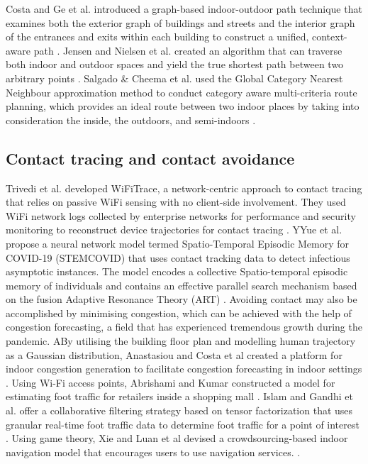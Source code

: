 \documentclass[acmtog]{acmart}
\begin{document}
Costa and Ge et al. introduced a graph-based indoor-outdoor path technique that examines both the exterior graph of buildings and streets and the interior graph of the entrances and exits within each building to construct a unified, context-aware path \cite{costa2019caprio}. Jensen and Nielsen et al. created an algorithm that can traverse both indoor and outdoor spaces and yield the true shortest path between two arbitrary points \cite{jensen2016outdoor}. Salgado \& Cheema et al. used the Global Category Nearest Neighbour approximation method to conduct category aware multi-criteria route planning, which provides an ideal route between two indoor places by taking into consideration the inside, the outdoors, and semi-indoors \cite{salgado2018efficient}.

\subsection{Contact tracing and contact avoidance}

Trivedi et al. developed WiFiTrace, a network-centric approach to contact tracing that relies on passive WiFi sensing with no client-side involvement. They used WiFi network logs collected by enterprise networks for performance and security monitoring to reconstruct device trajectories for contact tracing \cite{trivedi2021wifitrace}. YYue et al. propose a neural network model termed Spatio-Temporal Episodic Memory for COVID-19 (STEMCOVID) that uses contact tracking data to detect infectious asymptotic instances. The model encodes a collective Spatio-temporal episodic memory of individuals and contains an effective parallel search mechanism based on the fusion Adaptive Resonance Theory (ART) \cite{hu2020silent}. Avoiding contact may also be accomplished by minimising congestion, which can be achieved with the help of congestion forecasting, a field that has experienced tremendous growth during the pandemic. ABy utilising the building floor plan and modelling human trajectory as a Gaussian distribution, Anastasiou and Costa et al created a platform for indoor congestion generation to facilitate congestion forecasting in indoor settings \cite{anastasiou2021epicgen}. Using Wi-Fi access points, Abrishami and Kumar constructed a model for estimating foot traffic for retailers inside a shopping mall \cite{abrishami2018using}. Islam and Gandhi et al. offer a collaborative filtering strategy based on tensor factorization that uses granular real-time foot traffic data to determine foot traffic for a point of interest \cite{islam2021spatiotemporal}. Using game theory, Xie and Luan et al devised a crowdsourcing-based indoor navigation model that encourages users to use navigation services. \cite{xie2021game}.
\end{document}
